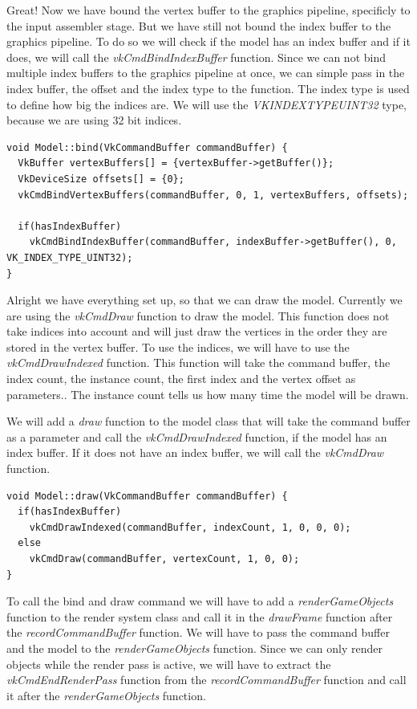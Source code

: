 \documentclass[12pt]{report} \usepackage{preamble}
\begin{document}
Great! Now we have bound the vertex buffer to the graphics pipeline, specificly to the input assembler stage.
But we have still not bound the index buffer to the graphics pipeline. To do so we will check if the model has an index buffer and if it does, we will call the \textit{vkCmdBindIndexBuffer}
function. Since we can not bind multiple index buffers to the graphics pipeline at once, we can simple pass in the index buffer, the offset and the index type to the function.
The index type is used to define how big the indices are. We will use the \textit{VK\textunderscore INDEX\textunderscore TYPE\textunderscore UINT32} type, because we are using 32 bit indices.

\begin{lstlisting}[Language=C++]
void Model::bind(VkCommandBuffer commandBuffer) {
  VkBuffer vertexBuffers[] = {vertexBuffer->getBuffer()};
  VkDeviceSize offsets[] = {0};
  vkCmdBindVertexBuffers(commandBuffer, 0, 1, vertexBuffers, offsets);

  if(hasIndexBuffer)
    vkCmdBindIndexBuffer(commandBuffer, indexBuffer->getBuffer(), 0, VK_INDEX_TYPE_UINT32);
}
\end{lstlisting}

Alright we have everything set up, so that we can draw the model. Currently we are using the \textit{vkCmdDraw} function to draw the model.
This function does not take indices into account and will just draw the vertices in the order they are stored in the vertex buffer.
To use the indices, we will have to use the \textit{vkCmdDrawIndexed} function. This function will take
the command buffer, the index count, the instance count, the first index and the vertex offset as parameters..
The instance count tells us how many time the model will be drawn.

We will add a \textit{draw} function to the model class that will take the command buffer as a parameter and call the \textit{vkCmdDrawIndexed} function,
if the model has an index buffer. If it does not have an index buffer, we will call the \textit{vkCmdDraw} function.

\begin{lstlisting}[Language=C++]
void Model::draw(VkCommandBuffer commandBuffer) {
  if(hasIndexBuffer)
    vkCmdDrawIndexed(commandBuffer, indexCount, 1, 0, 0, 0);
  else
    vkCmdDraw(commandBuffer, vertexCount, 1, 0, 0);
}
\end{lstlisting}

To call the bind and draw command we will have to add a \textit{renderGameObjects} function to the render system class and call it in the \textit{drawFrame} function
after the \textit{recordCommandBuffer} function. We will have to pass the command buffer and the model to the \textit{renderGameObjects} function. Since we can only render
objects while the render pass is active, we will have to extract the \textit{vkCmdEndRenderPass} function from the \textit{recordCommandBuffer} function and call it after
the \textit{renderGameObjects} function.
\end{document}
